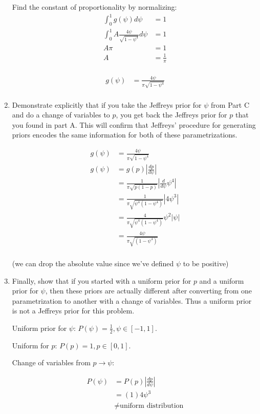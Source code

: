 \begin{enumerate}[label=\textbf{\Alph*}.]
    Find the constant of proportionality by normalizing:
    \begin{align*}
        \int_0^1 g(\psi)d\psi &= 1 \\
        \int_0^1 A \frac{4\psi}{\sqrt{1-\psi^4}} d\psi &= 1 \\
        A \pi &= 1 \\
        A &= \frac{1}{\pi} \\
    \end{align*}

    \begin{align*}
        g(\psi) &= \frac{4\psi}{\pi\sqrt{1-\psi^4}} \\
    \end{align*}

    \item Demonstrate explicitly that if you take the Jeffreys prior for $\psi$ from Part C and do a change of variables to $p$, you get back the Jeffreys prior for $p$ that you found in part A. This will confirm that Jeffreys' procedure for generating priors encodes the same information for both of these parametrizations.

    \begin{align*}
        g(\psi) &= \frac{4\psi}{\pi\sqrt{1-\psi^4}} \\
        g(\psi) &= g(p)\left|\frac{dp}{d\psi}\right| \\
        &= \frac{1}{\pi\sqrt{p(1-p)}}\left|\frac{d}{d\psi}\psi^4\right| \\
        &= \frac{1}{\pi\sqrt{\psi^4(1-\psi^4)}}\left|4\psi^3\right| \\
        &= \frac{4}{\pi\sqrt{\psi^4(1-\psi^4)}}\psi^2|\psi| \\
        &= \frac{4\psi}{\pi\sqrt{(1-\psi^4)}} \\
    \end{align*}

    (we can drop the absolute value since we've defined $\psi$ to be positive)

    \item Finally, show that if you started with a uniform prior for $p$ and a uniform prior for $\psi$, then these priors are actually different after converting from one parametrization to another with a change of variables. Thus a uniform prior is not a Jeffreys prior for this problem.
    
    Uniform prior for $\psi$: $P(\psi) = \frac{1}{2}, \psi \in [-1,1]$.

    Uniform for $p$: $P(p) = 1, p \in [0,1]$.

    Change of variables from $p \to \psi$:

    \begin{align*}
        P(\psi) &= P(p) \left|\frac{dp}{d\psi}\right| \\
        &= (1) 4\psi^3 \\
        &\neq \text{uniform distribution} \\
    \end{align*}

\end{enumerate}
